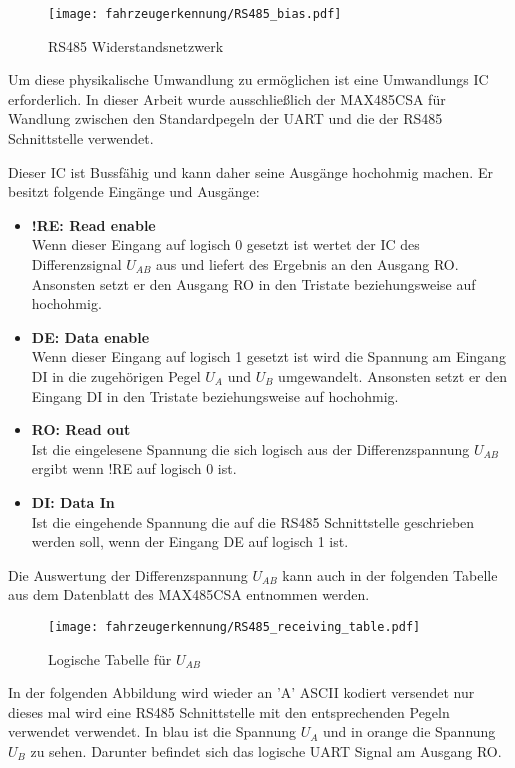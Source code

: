 \begin{figure}[H]
    \centering
    \texttt{[image: fahrzeugerkennung/RS485\_bias.pdf]}
    \caption{RS485 Widerstandsnetzwerk}
\end{figure}

Um diese physikalische Umwandlung zu ermöglichen ist eine Umwandlungs IC erforderlich. In dieser Arbeit wurde ausschließlich der MAX485CSA für Wandlung zwischen den Standardpegeln der UART
und die der RS485 Schnittstelle verwendet.

Dieser IC ist Bussfähig und kann daher seine Ausgänge hochohmig machen. Er besitzt folgende Eingänge und Ausgänge:
\begin{itemize}
    \item \textbf{!RE: Read enable} \\
    Wenn dieser Eingang auf logisch 0 gesetzt ist wertet der IC des Differenzsignal $U_{AB}$ aus und liefert des Ergebnis an den Ausgang RO.
    Ansonsten setzt er den Ausgang RO in den Tristate beziehungsweise auf hochohmig.
    \item \textbf{DE: Data enable} \\
    Wenn dieser Eingang auf logisch 1 gesetzt ist wird die Spannung am Eingang DI in die zugehörigen Pegel $U_{A}$ und $U_{B}$ umgewandelt.
    Ansonsten setzt er den Eingang DI in den Tristate beziehungsweise auf hochohmig.
    \item \textbf{RO: Read out} \\
    Ist die eingelesene Spannung die sich logisch aus der Differenzspannung $U_{AB}$ ergibt wenn !RE auf logisch 0 ist.
    \item \textbf{DI: Data In} \\
    Ist die eingehende Spannung die auf die RS485 Schnittstelle geschrieben werden soll, wenn der Eingang DE auf logisch 1 ist.
\end{itemize}

Die Auswertung der Differenzspannung $U_{AB}$ kann auch in der folgenden Tabelle aus dem Datenblatt des MAX485CSA entnommen werden. 

\begin{figure}[H]
    \centering
    \texttt{[image: fahrzeugerkennung/RS485\_receiving\_table.pdf]}
    \caption{Logische Tabelle für $U_{AB}$}
\end{figure}

In der folgenden Abbildung wird wieder an 'A' ASCII kodiert versendet nur dieses mal wird eine RS485 Schnittstelle mit den entsprechenden Pegeln verwendet verwendet.
In blau ist die Spannung $U_{A}$ und in orange die Spannung $U_{B}$ zu sehen. Darunter befindet sich das logische UART Signal am Ausgang RO. 

